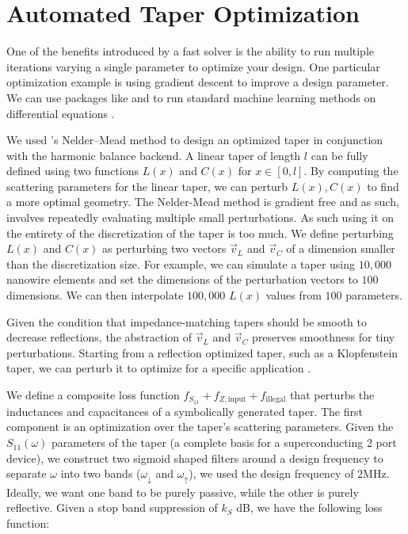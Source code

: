 \section{Automated Taper Optimization}

One of the benefits introduced by a fast solver is the ability to run multiple iterations varying a
single parameter to optimize your design. One particular optimization example is using gradient descent
to improve a design parameter. We can use packages like  and  to run standard
machine learning methods on differential equations \cite{fluxjl, optimjl}.

We used 's Nelder–Mead method to design an optimized taper in conjunction with the
harmonic balance backend. A linear taper of length $l$ can be fully defined using two 
functions $L(x)$ and $C(x)$ for $x\in[0, l]$.
By computing the scattering parameters for the linear taper, we can perturb $L(x), C(x)$ to
find a more optimal geometry. The Nelder-Mead method is gradient free and as such, involves
repeatedly evaluating multiple small perturbations. As such using it on the entirety of the 
discretization of the taper is too much. We define perturbing $L(x)$ and $C(x)$ as perturbing
two vectors $\vec v_L$ and $\vec v_C$ of a dimension smaller than the discretization size.
For example, we can simulate a taper using $10,000$ nanowire elements and set the dimensions of
the perturbation vectors to $100$ dimensions. We can then interpolate $100,000$ $L(x)$ values 
from $100$ parameters.

Given the condition that impedance-matching tapers should be smooth to decrease reflections,
the abstraction of $\vec v_L$ and $\vec v_C$ preserves smoothness for tiny perturbations.
Starting from a reflection optimized taper, such as a Klopfenstein taper, we can perturb
it to optimize for a specific application \cite{klopfenstein_transmission_1956}.

We define a composite loss function 
$f_{S_{11}} + f_{Z, \text{input}} + f_{\text{illegal}}$ 
that perturbs the inductances and capacitances
of a symbolically generated taper. The first component is an optimization over the taper's
scattering parameters. Given the $S_{11}(\omega)$ parameters of the taper (a complete basis for a
superconducting 2 port device), we construct two sigmoid shaped filters around a design
frequency to separate $\omega$ into two bands ($\omega_\downarrow$ and $\omega_\uparrow$), we
used the design frequency of $2$\si{MHz}. 
Ideally, we want one band to be purely passive, while the other is purely reflective.
Given a stop band suppression of $k_S$ \si{dB}, we have the following loss function:

